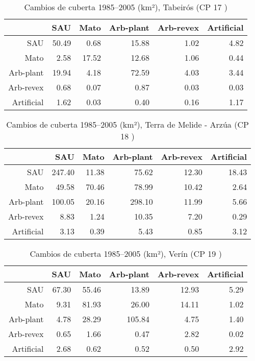 \begin{table}[p]
\centering
\caption{Cambios de cuberta 1985--2005 (km²), Tabeirós (CP 17 )} 
\label{TaboaContinxCP17}
\begin{tabular}{rrrrrr}
  \hline
 & SAU & Mato & Arb-plant & Arb-revex & Artificial \\ 
  \hline
SAU & 50.49 & 0.68 & 15.88 & 1.02 & 4.82 \\ 
  Mato & 2.58 & 17.52 & 12.68 & 1.06 & 0.44 \\ 
  Arb-plant & 19.94 & 4.18 & 72.59 & 4.03 & 3.44 \\ 
  Arb-revex & 0.68 & 0.07 & 0.87 & 0.03 & 0.03 \\ 
  Artificial & 1.62 & 0.03 & 0.40 & 0.16 & 1.17 \\ 
   \hline
\end{tabular}
\end{table}
\begin{table}[p]
\centering
\caption{Cambios de cuberta 1985--2005 (km²), Terra de Melide - Arzúa (CP 18 )} 
\label{TaboaContinxCP18}
\begin{tabular}{rrrrrr}
  \hline
 & SAU & Mato & Arb-plant & Arb-revex & Artificial \\ 
  \hline
SAU & 247.40 & 11.38 & 75.62 & 12.30 & 18.43 \\ 
  Mato & 49.58 & 70.46 & 78.99 & 10.42 & 2.64 \\ 
  Arb-plant & 100.05 & 20.16 & 298.10 & 11.99 & 5.66 \\ 
  Arb-revex & 8.83 & 1.24 & 10.35 & 7.20 & 0.29 \\ 
  Artificial & 3.13 & 0.39 & 5.43 & 0.85 & 3.12 \\ 
   \hline
\end{tabular}
\end{table}
\begin{table}[p]
\centering
\caption{Cambios de cuberta 1985--2005 (km²), Verín (CP 19 )} 
\label{TaboaContinxCP19}
\begin{tabular}{rrrrrr}
  \hline
 & SAU & Mato & Arb-plant & Arb-revex & Artificial \\ 
  \hline
SAU & 67.30 & 55.46 & 13.89 & 12.93 & 5.29 \\ 
  Mato & 9.31 & 81.93 & 26.00 & 14.11 & 1.02 \\ 
  Arb-plant & 4.78 & 28.29 & 105.84 & 4.75 & 1.40 \\ 
  Arb-revex & 0.65 & 1.66 & 0.47 & 2.82 & 0.02 \\ 
  Artificial & 2.68 & 0.62 & 0.52 & 0.50 & 2.92 \\ 
   \hline
\end{tabular}
\end{table}
